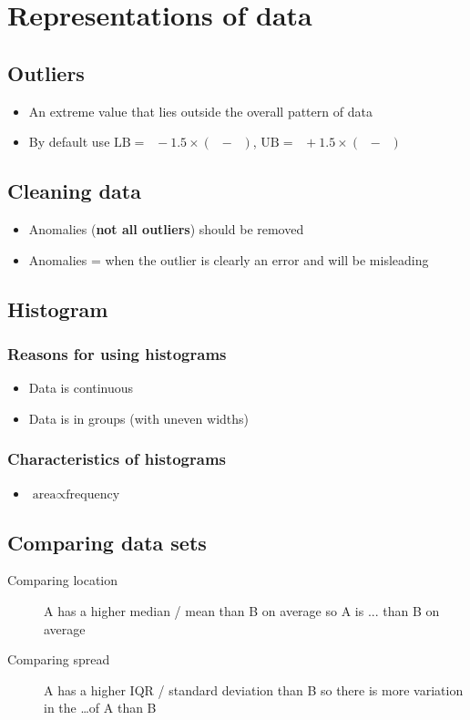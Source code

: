 \documentclass[oneside,fleqn,11pt]{book}
\DeclareMathOperator\UQ{Q_3}
\DeclareMathOperator\LQ{Q_1}
\begin{document}
	
	\pagebreak
	
	
	\chapter{Representations of data}
	\section{Outliers}
	\begin{itemize}
		\item An extreme value that lies outside the overall pattern of data
		\item By default use $\text{LB} = \LQ - 1.5\times(\UQ-\LQ)$, $\text{UB} = \UQ + 1.5\times(\UQ-\LQ)$
	\end{itemize}
	
	\section{Cleaning data}
	\begin{itemize}
		\item Anomalies (\textbf{not all outliers}) should be removed
		\item Anomalies = when the outlier is clearly an error and will be misleading
	\end{itemize}
	
	
	\section{Histogram}
	\subsection{Reasons for using histograms}
	\begin{itemize}
		\item Data is continuous
		\item Data is in groups (with uneven widths)
	\end{itemize}
	\subsection{Characteristics of histograms}
	\begin{itemize}
		\item $\text{area}\propto\text{frequency}$
	\end{itemize}
	
	\section{Comparing data sets}
	\begin{description}
		\item[Comparing location] A has a higher median / mean than B on average so A is ... than B on average
		\item[Comparing spread] A has a higher IQR / standard deviation than B so there is more variation in the \dots of A than B
	\end{description}
	
\end{document}
